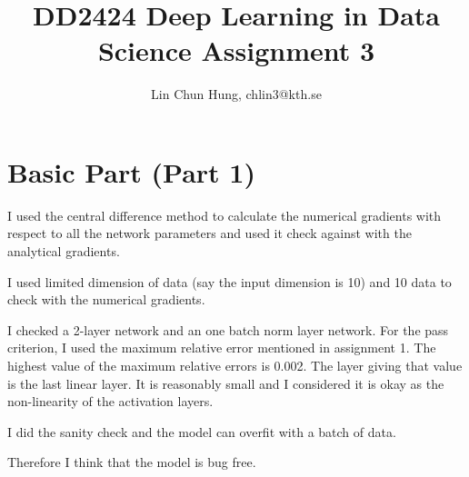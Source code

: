 \documentclass[12pt]{article}
\newenvironment{question}[2][Question]{\begin{trivlist}
\kern10pt
\item[\hskip \labelsep {\bfseries #1}\hskip \labelsep {\bfseries #2.}]}{\end{trivlist}}
\begin{document}
\title{DD2424 Deep Learning in Data Science Assignment 3}
\author{Lin Chun Hung, chlin3@kth.se}

\maketitle

\section{Basic Part (Part 1)}
\begin{question}{i}
    I used the central difference method to calculate the numerical gradients
    with respect to all the network parameters and used it check against with the
    analytical gradients.

    I used limited dimension of data (say the input dimension is 10) and 10
    data to check with the numerical gradients.

    I checked a 2-layer network and an one batch norm layer network.
    For the pass criterion, I used the maximum relative error mentioned in assignment 1.
    The highest value of the maximum relative errors is 0.002. The layer giving 
    that value is the last linear layer. It is reasonably small and I considered
    it is okay as the non-linearity of the activation layers.

    I did the sanity check and the model can overfit with a batch of data.

    Therefore I think that the model is bug free.
\end{question}


\begin{question}{ii}
   
\end{question}
\end{document}
